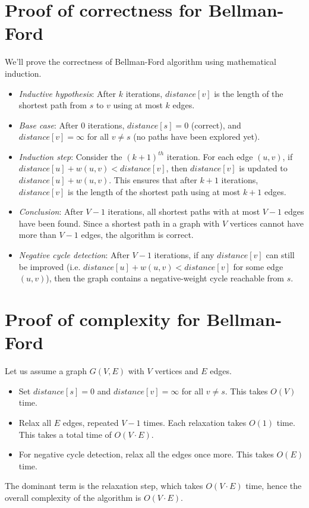 \begin{appendices}
	\section{Proof of correctness for Bellman-Ford}\label{appendix:bellford:correctness}
	We'll prove the correctness of Bellman-Ford algorithm using mathematical induction.
	\begin{itemize}
		\item \textit{Inductive hypothesis}: After $k$ iterations, $distance[v]$ is the length of the shortest path from $s$ to $v$ using at most $k$ edges.
		\item \textit{Base case}: After 0 iterations, $distance[s]=0$ (correct), and $distance[v] = \infty$ for all $v \neq s$ (no paths have been explored yet).
		\item \textit{Induction step}: Consider the $(k+1)^{th}$ iteration. For each edge $(u,v)$, if $distance[u]+w(u,v)<distance[v]$, then $distance[v]$ is updated to $distance[u]+w(u,v)$. This ensures that after $k+1$ iterations, $distance[v]$ is the length of the shortest path using at most $k+1$ edges.
		\item \textit{Conclusion}: After $V-1$ iterations, all shortest paths with at most $V-1$ edges have been found. Since a shortest path in a graph with $V$ vertices cannot have more than $V-1$ edges, the algorithm is correct.
		\item \textit{Negative cycle detection}: After $V - 1$ iterations, if any $distance[v]$ can still be improved (i.e. $distance[u]+w(u,v)<distance[v]$ for some edge $(u,v)$), then the graph contains a negative-weight cycle reachable from $s$.
	\end{itemize}
	\section{Proof of complexity for Bellman-Ford}\label{appendix:bellford:complexity}
	Let us assume a graph $G(V, E)$ with $V$ vertices and $E$ edges.
	\begin{itemize}
		\item Set $distance[s]=0$ and $distance[v]=\infty$ for all $v \neq s$. This takes $O(V)$ time.
		\item Relax all $E$ edges, repeated $V - 1$ times. Each relaxation takes $O(1)$ time. This takes a total time of $O(V \cdot E)$.
		\item For negative cycle detection, relax all the edges once more. This takes $O(E)$ time.
	\end{itemize}
	The dominant term is the relaxation step, which takes $O(V \cdot E)$ time, hence the overall complexity of the algorithm is $O(V \cdot E)$.
\end{appendices}